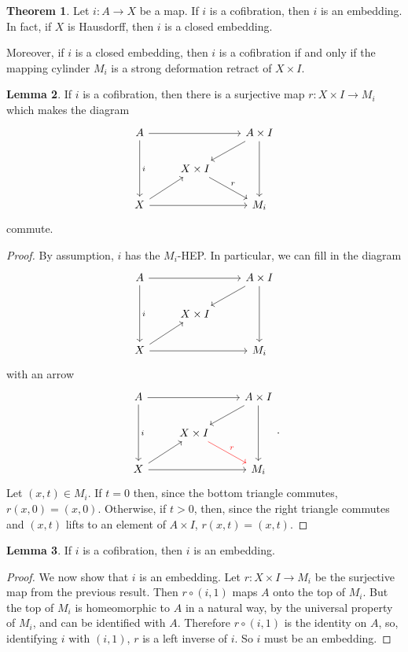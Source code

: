 \documentclass[10pt]{article}
\theoremstyle{definition}
\newtheorem{lemma}{Lemma}[exer]
\newtheorem{theorem}[lemma]{Theorem}
\begin{document}
\begin{theorem}
Let $i: A \to X$ be a map. If $i$ is a cofibration, then $i$ is an embedding. In fact, if $X$ is Hausdorff, then $i$ is a closed embedding.

Moreover, if $i$ is a closed embedding, then $i$ is a cofibration if and only if the mapping cylinder $M_i$ is a strong deformation retract of $X \times I$.
\end{theorem}

\begin{lemma}
If $i$ is a cofibration, then there is a surjective map $r: X \times I \to M_i$ which makes the diagram
$$\begin{tikzcd}
A \arrow[rr] \arrow[dd,"i"] && A \times I \arrow[dl] \arrow[dd]\\
& X \times I \arrow[dr,"r"]\\
X \arrow[ur] \arrow[rr] && M_i
\end{tikzcd}$$
commute.
\end{lemma}
\begin{proof}
By assumption, $i$ has the $M_i$-HEP. In particular, we can fill in the diagram
$$\begin{tikzcd}
A \arrow[rr] \arrow[dd,"i"] && A \times I \arrow[dl] \arrow[dd]\\
& X \times I \\
X \arrow[ur] \arrow[rr] && M_i
\end{tikzcd}$$
with an arrow
$$\begin{tikzcd}
A \arrow[rr] \arrow[dd,"i"] && A \times I \arrow[dl] \arrow[dd]\\
& X \times I \arrow[dr,"r",color=red]\\
X \arrow[ur] \arrow[rr] && M_i
\end{tikzcd}.$$
Let $(x, t) \in M_i$. If $t = 0$ then, since the bottom triangle commutes, $r(x, 0) = (x, 0)$.
Otherwise, if $t > 0$, then, since the right triangle commutes and $(x, t)$ lifts to an element of $A \times I$, $r(x, t) = (x, t)$.
\end{proof}

\begin{lemma}
If $i$ is a cofibration, then $i$ is an embedding.
\end{lemma}
\begin{proof}
We now show that $i$ is an embedding. Let $r: X \times I \to M_i$ be the surjective map from the previous result.
Then $r \circ (i, 1)$ maps $A$ onto the top of $M_i$.
But the top of $M_i$ is homeomorphic to $A$ in a natural way, by the universal property of $M_i$, and can be identified with $A$.
Therefore $r \circ (i, 1)$ is the identity on $A$, so, identifying $i$ with $(i, 1)$, $r$ is a left inverse of $i$.
So $i$ must be an embedding.
\end{proof}
\end{document}
